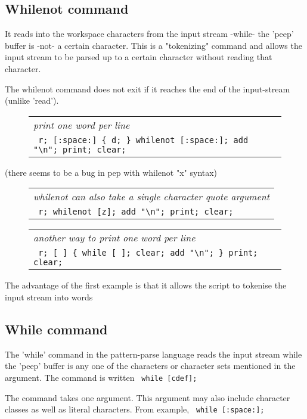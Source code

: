 \documentclass[a4paper,12pt]{article}
\begin{document}
\subsection{Whilenot command}
  
  It reads into the workspace characters from the input stream -while- the
  'peep' buffer is -not- a certain character. This is a "tokenizing" command
  and allows the input stream to be parsed up to a certain character without
  reading that character.

  The whilenot command does not exit if it reaches the end of the
  input-stream (unlike 'read').
 \begin{figure}
 \begin{tabular}{ l }
 \emph{ print one word per line } \\ 
 \verb| r; [:space:] { d; } whilenot [:space:]; add "\n"; print; clear; |
 \end{tabular} 
 \end{figure}

  (there seems to be a bug in pep with whilenot "x" syntax)
 \begin{figure}
 \begin{tabular}{ l }
 \emph{ whilenot can also take a single character quote argument } \\ 
 \verb| r; whilenot [z]; add "\n"; print; clear; |
 \end{tabular} 
 \end{figure}
 \begin{figure}
 \begin{tabular}{ l }
 \emph{ another way to print one word per line } \\ 
 \verb| r; [ ] { while [ ]; clear; add "\n"; } print; clear; |
 \end{tabular} 
 \end{figure}

  The advantage of the first example is that it allows the
  script to tokenise the input stream into words

\subsection{While command}

  The 'while' command in the pattern-parse language reads the
  input stream while the 'peep' buffer is any one of the
  characters or character sets mentioned in the argument.
  The command is written 
 \verb| while [cdef]; |


  The command takes one argument. This argument may also
  include character classes as well as literal characters.
  From example, 
 \verb| while [:space:]; |
\end{document}
